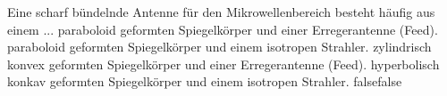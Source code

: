     {Eine scharf bündelnde Antenne für den Mikrowellenbereich besteht häufig aus einem ...}
    {paraboloid geformten Spiegelkörper und einer Erregerantenne (Feed).}
    {paraboloid geformten Spiegelkörper und einem isotropen Strahler.}
    {zylindrisch konvex geformten Spiegelkörper und einer Erregerantenne (Feed).}
    {hyperbolisch konkav geformten Spiegelkörper und einem isotropen Strahler.}
    {false}{false}